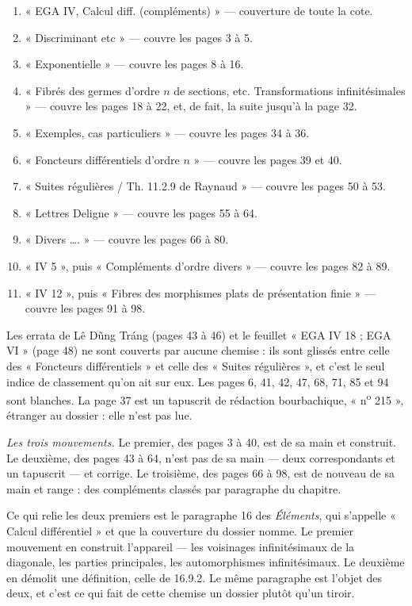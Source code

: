 \documentclass[11pt,a4paper]{article}
\begin{document}
\begin{enumerate}
  \item[\emph{p.\,1}] « EGA IV, Calcul diff. (compléments) » — couverture de toute la
  cote.
  \item[\emph{p.\,2}] « Discriminant etc » — couvre les pages 3 à 5.
  \item[\emph{p.\,7}] « Exponentielle » — couvre les pages 8 à 16.
  \item[\emph{p.\,17}] « Fibrés des germes d'ordre $n$ de sections, etc. Transformations
  infinitésimales » — couvre les pages 18 à 22, et, de fait, la suite jusqu'à
  la page 32.
  \item[\emph{p.\,33}] « Exemples, cas particuliers » — couvre les pages 34 à 36.
  \item[\emph{p.\,38}] « Foncteurs différentiels d'ordre $n$ » — couvre les pages 39 et
  40.
  \item[\emph{p.\,49}] « Suites régulières / Th. 11.2.9 de Raynaud » — couvre les pages
  50 à 53.
  \item[\emph{p.\,54}] « Lettres Deligne » — couvre les pages 55 à 64.
  \item[\emph{p.\,65}] « Divers …. » — couvre les pages 66 à 80.
  \item[\emph{p.\,81}] « IV 5 », puis « Compléments d'ordre divers » — couvre les pages
  82 à 89.
  \item[\emph{p.\,90}] « IV 12 », puis « Fibres des morphismes plats de présentation
  finie » — couvre les pages 91 à 98.
\end{enumerate}

Les errata de Lê Dũng Tráng (pages 43 à 46) et le feuillet « EGA IV 18 ; EGA
VI » (page 48) ne sont couverts par aucune chemise : ils sont glissés entre
celle des « Foncteurs différentiels » et celle des « Suites régulières », et
c'est le seul indice de classement qu'on ait sur eux. Les pages 6, 41, 42, 47,
68, 71, 85 et 94 sont blanches. La page 37 est un tapuscrit de rédaction
bourbachique, « n\textsuperscript{o} 215 », étranger au dossier : elle n'est
pas lue.

\emph{Les trois mouvements.} Le premier, des pages 3 à 40, est de sa main et
construit. Le deuxième, des pages 43 à 64, n'est pas de sa main — deux
correspondants et un tapuscrit — et corrige. Le troisième, des pages 66 à 98,
est de nouveau de sa main et range : des compléments classés par paragraphe du
chapitre.

Ce qui relie les deux premiers est le paragraphe 16 des \emph{Éléments}, qui
s'appelle « Calcul différentiel » et que la couverture du dossier nomme. Le
premier mouvement en construit l'appareil — les voisinages infinitésimaux de la
diagonale, les parties principales, les automorphismes infinitésimaux. Le
deuxième en démolit une définition, celle de 16.9.2. Le même paragraphe est
l'objet des deux, et c'est ce qui fait de cette chemise un dossier plutôt qu'un
tiroir.
\end{document}
